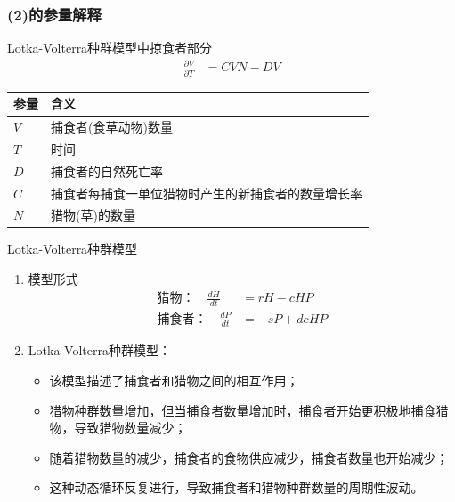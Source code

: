 \documentclass[aspectratio=169, 12pt, utf8, mathserif]{ctexbeamer} %
\begin{document}
\begin{frame}
	\frametitle{(2)的参量解释}
	\begin{exampleblock}{Lotka-Volterra种群模型中掠食者部分}
		\begin{align*}
			\frac{\partial V}{\partial T} &= CVN - DV
		\end{align*}
		\begin{center}
			\begin{tabular}{p{5cm}p{9cm}}
				\toprule
				参量 & 含义 \\
				\midrule
				\(V\) & 捕食者(食草动物)数量 \\
				\(T\) & 时间 \\
				\(D\) & 捕食者的自然死亡率 \\
				\(C\) & 捕食者每捕食一单位猎物时产生的新捕食者的数量增长率 \\
				\(N\) & 猎物(草)的数量 \\
				\bottomrule
			\end{tabular}
		\end{center}
	\end{exampleblock}
\end{frame}


\begin{frame}
	\begin{exampleblock}{Lotka-Volterra种群模型\cite{[3]}}
		\begin{enumerate}
		    \item 模型形式
			\begin{align*}
				\text{猎物：} \quad \frac{dH}{dt} &= rH - cHP \\
				\text{捕食者：} \quad \frac{dP}{dt} &= -sP + dcHP
			\end{align*}
			\item Lotka-Volterra种群模型：
			
			\begin{itemize}
				\item 该模型描述了捕食者和猎物之间的相互作用；\\
				\item 猎物种群数量增加，但当捕食者数量增加时，捕食者开始更积极地捕食猎物，导致猎物数量减少；\\
				\item 随着猎物数量的减少，捕食者的食物供应减少，捕食者数量也开始减少；\\
				\item 这种动态循环反复进行，导致捕食者和猎物种群数量的周期性波动。\\
			\end{itemize}
		\end{enumerate}
	\end{exampleblock}
\end{frame}
\end{document}
